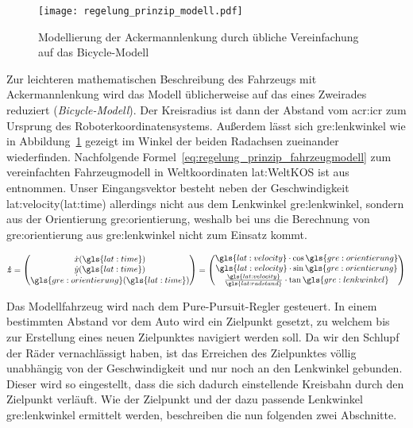 \begin{figure}[H] %
  \centering
  \texttt{[image: regelung\_prinzip\_modell.pdf]}
  \caption{Modellierung der Ackermannlenkung durch übliche Vereinfachung auf das Bicycle-Modell}
  \label{fig:regelung_prinzip_modell}
\end{figure}

Zur leichteren mathematischen Beschreibung des Fahrzeugs mit Ackermannlenkung wird das Modell üblicherweise auf das eines Zweirades reduziert (\emph{Bicycle-Modell}). Der Kreisradius ist dann der Abstand vom \gls{acr:icr} zum Ursprung des Roboterkoordinatensystems. Außerdem lässt sich \gls{gre:lenkwinkel} wie in Abbildung~\ref{fig:regelung_prinzip_modell} gezeigt im Winkel der beiden Radachsen zueinander wiederfinden. Nachfolgende Formel~\ref{eq:regelung_prinzip_fahrzeugmodell} zum vereinfachten Fahrzeugmodell in Weltkoordinaten \gls{lat:WeltKOS} ist aus \autocite{corkeRoboticsVisionControl2017} entnommen. Unser Eingangsvektor besteht neben der Geschwindigkeit \gls{lat:velocity}(\gls{lat:time}) allerdings nicht aus dem Lenkwinkel \gls{gre:lenkwinkel}, sondern aus der Orientierung \gls{gre:orientierung}, weshalb bei uns die Berechnung von \gls{gre:orientierung} aus \gls{gre:lenkwinkel} nicht zum Einsatz kommt. 

\begin{equation}
\boldsymbol{\dot{z}} = 
\begin{pmatrix}
\dot{x}(\gls{lat:time}) 	\\
\dot{y}(\gls{lat:time})	\\
\dot{\gls{gre:orientierung}}(\gls{lat:time})    	\\
\end{pmatrix}
=
\begin{pmatrix}
\gls{lat:velocity} \cdot \cos \gls{gre:orientierung} 	\\
\gls{lat:velocity} \cdot \sin \gls{gre:orientierung} 	\\
\frac{\gls{lat:velocity}}{\gls{lat:radstand}} \cdot \tan \gls{gre:lenkwinkel}    	\\
\end{pmatrix}
\label{eq:regelung_prinzip_fahrzeugmodell}
\end{equation} 

Das Modellfahrzeug wird nach dem \glqq Pure-Pursuit\grqq-Regler gesteuert. In einem bestimmten Abstand vor dem Auto wird ein Zielpunkt gesetzt, zu welchem bis zur Erstellung eines neuen Zielpunktes navigiert werden soll. Da wir den Schlupf der Räder vernachlässigt haben, ist das Erreichen des Zielpunktes völlig unabhängig von der Geschwindigkeit und nur noch an den Lenkwinkel gebunden. Dieser wird so eingestellt, dass die sich dadurch einstellende Kreisbahn durch den Zielpunkt verläuft. Wie der Zielpunkt und der dazu passende Lenkwinkel \gls{gre:lenkwinkel} ermittelt werden, beschreiben die nun folgenden zwei Abschnitte.
